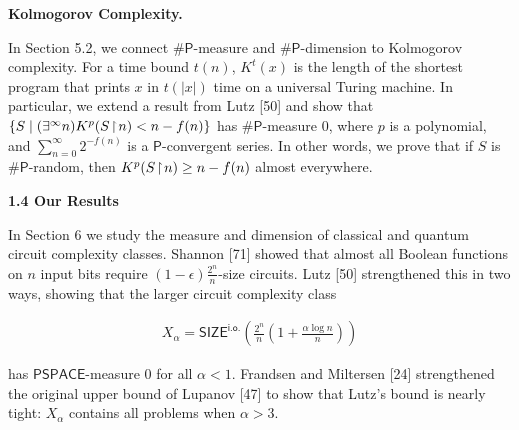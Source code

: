 \documentclass[10pt,a4paper]{article}
\begin{document}
\par\medskip\noindent\textbf{Kolmogorov Complexity.}\par




In Section 5.2, we connect
${\mathsf{\#}\mathsf{P}}$-measure and ${\mathsf{\#}\mathsf{P}}$-dimension to Kolmogorov complexity. For a time bound $t(n)$, $K^{t}(x)$ is the length of the shortest program that prints $x$ in $t(|x|)$ time on a universal Turing machine. In particular, we extend a result from Lutz [50] and show that $\{S\mid(\exists^{\infty}n)K^{p}(S\negthinspace\upharpoonright\negthinspace n)<n-f(n)\}$ has ${\mathsf{\#}\mathsf{P}}$-measure 0, where $p$ is a polynomial, and $\sum_{n=0}^{\infty}2^{-f(n)}$ is a $\mathsf{P}$-convergent series. In other words, we prove that if $S$ is ${\mathsf{\#}\mathsf{P}}$-random, then $K^{p}(S\negthinspace\upharpoonright\negthinspace n)\geq n-f(n)$ almost everywhere.\par






\par\medskip\noindent\textbf{
1.4 Our Results}\par




In Section 6 we study the measure and dimension of classical and quantum circuit complexity classes.
Shannon [71] showed that almost all Boolean functions on $n$ input bits require $(1-\epsilon)\frac{2^{n}}{n}$-size circuits.
Lutz [50] strengthened this in two ways,
showing that the larger circuit complexity class\par


\[\begin{gathered}
X_{\alpha}=\mathsf{SIZE}^{\mathsf{i.o.}}\!\!\left(\frac{2^{n}}{n}\left(1+\frac{\alpha\log n}{n}\right)\right)
\end{gathered}\]


has $\mathsf{PSPACE}$-measure 0 for all $\alpha<1$.
Frandsen and Miltersen [24] strengthened the original upper bound of Lupanov [47] to show that Lutz’s bound is nearly tight: $X_{\alpha}$ contains all problems when $\alpha>3$.\par
\end{document}
